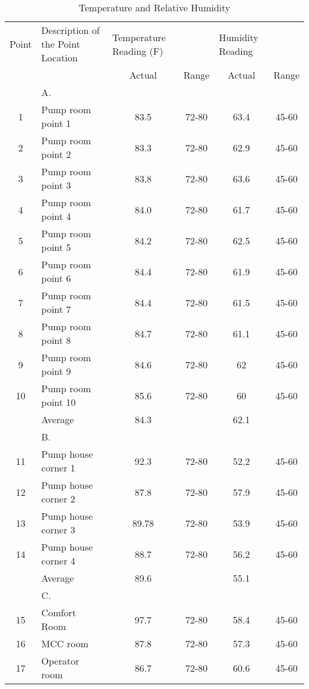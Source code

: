 \begin{table}
	\caption{Temperature and Relative Humidity}
	\label{ch047_tbl_tdb_rh}

	{\footnotesize

\begin{tabular}{c|p{4cm}|c|c|c|c}

\hline
Point & Description of the Point Location & \multicolumn{1}{l}{Temperature Reading (F)} & \multicolumn{1}{l}{} & \multicolumn{1}{l}{Humidity Reading} &  \\ 
\cline{3-6}
 &  & Actual & Range & Actual & Range \\ 
\hline
 & A. &  &  &  &  \\ 
1 & Pump room point 1 & 83.5 & 72-80 & 63.4 & 45-60 \\ 
2 & Pump room point 2 & 83.3 & 72-80 & 62.9 & 45-60 \\ 
3 & Pump room point 3 & 83.8 & 72-80 & 63.6 & 45-60 \\ 
4 & Pump room point 4 & 84.0 & 72-80 & 61.7 & 45-60 \\ 
5 & Pump room point 5 & 84.2 & 72-80 & 62.5 & 45-60 \\ 
6 & Pump room point 6 & 84.4 & 72-80 & 61.9 & 45-60 \\ 
7 & Pump room point 7 & 84.4 & 72-80 & 61.5 & 45-60 \\ 
8 & Pump room point 8 & 84.7 & 72-80 & 61.1 & 45-60 \\ 
9 & Pump room point 9 & 84.6 & 72-80 & 62 & 45-60 \\ 
10 & Pump room point 10 & 85.6 & 72-80 & 60 & 45-60 \\ 
 & Average & 84.3 &  & 62.1 &  \\ 
\hline
 & B. &  &  &  &  \\ 
11 & Pump house corner 1 & 92.3 & 72-80 & 52.2 & 45-60 \\ 
12 & Pump house corner 2 & 87.8 & 72-80 & 57.9 & 45-60 \\ 
13 & Pump house corner 3 & 89.78 & 72-80 & 53.9 & 45-60 \\ 
14 & Pump house corner 4 & 88.7 & 72-80 & 56.2 & 45-60 \\ 
 & Average & 89.6 &  & 55.1 &  \\ 
\hline
 & C. &  &  &  &  \\ 
15 & Comfort Room & 97.7 & 72-80 & 58.4 & 45-60 \\ 
16 & MCC room & 87.8 & 72-80 & 57.3 & 45-60 \\ 
17 & Operator room & 86.7 & 72-80 & 60.6 & 45-60 \\ 
\hline

\end{tabular}
}
\end{table}